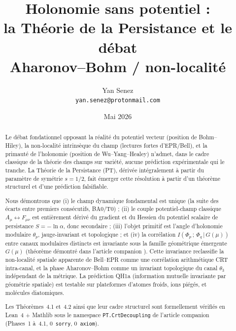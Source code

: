 \documentclass[12pt,a4paper]{article}
\title{\textbf{Holonomie sans potentiel :\\
la Théorie de la Persistance et le débat\\
Aharonov--Bohm / non-localité}}
\author{Yan Senez\\
\texttt{yan.senez@protonmail.com}}
\date{Mai 2026}
\begin{document}
\maketitle

\begin{abstract}
Le débat fondationnel opposant la réalité du potentiel vecteur
(position de Bohm--Hiley), la non-localité intrinsèque du champ
(lectures fortes d'EPR/Bell), et la primauté de l'holonomie
(position de Wu--Yang--Healey) n'admet, dans le cadre classique de
la théorie des champs sur variété, aucune prédiction expérimentale
qui le tranche. La Théorie de la Persistance (PT), dérivée
intégralement à partir du paramètre de symétrie $s = 1/2$, fait
émerger cette résolution à partir d'un théorème structurel et
d'une prédiction falsifiable.

Nous démontrons que (i) le champ dynamique fondamental est unique
(la suite des écarts entre premiers consécutifs, BA0/T0) ;
(ii) le couple potentiel-champ classique $A_\mu \leftrightarrow
F_{\mu\nu}$ est entièrement dérivé du gradient et du Hessien du
potentiel scalaire de persistance $S = -\ln \alpha$, donc
secondaire ; (iii) l'objet primitif est l'angle d'holonomie
modulaire $\theta_p$, jauge-invariant et topologique ; et (iv) la
corrélation $I(\Phi_p\,;\,\Phi_q\,|\,G(\mu))$ entre canaux
modulaires distincts est invariante sous la famille géométrique
émergente $G(\mu)$ (théorème démontré dans l'article companion
\cite{PT_CRT_DECOUPLING}). Cette invariance reclassifie la
non-localité spatiale apparente de Bell--EPR comme une corrélation
arithmétique CRT intra-canal, et la phase Aharonov--Bohm comme un
invariant topologique du canal $\theta_3$ indépendant de la
métrique. La prédiction QH1a (information mutuelle invariante par
géométrie spatiale) est testable sur plateformes d'atomes froids,
ions piégés, et molécules diatomiques.

Les Théorèmes~4.1 et~4.2 ainsi que leur cadre structurel sont
formellement vérifiés en Lean~4 + Mathlib sous le namespace
\texttt{PT.CrtDecoupling} de l'article companion
\cite{PT_CRT_DECOUPLING} (Phases~1 à~4.1, 0~\texttt{sorry},
0~\texttt{axiom}).
\end{abstract}

\tableofcontents











\end{document}
